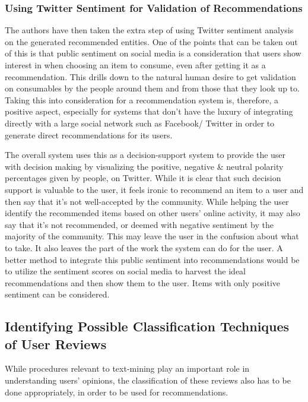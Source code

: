 \documentclass[manuscript,screen,review]{acmart}
\begin{document}
\subsubsection{Using Twitter Sentiment for Validation of Recommendations}
The authors have then taken the extra step of using Twitter sentiment analysis on the generated recommended entities. One of the points that can be taken out of this is that public sentiment on social media is a consideration that users show interest in when choosing an item to consume, even after getting it as a recommendation. This drills down to the natural human desire to get validation on consumables by the people around them and from those that they look up to. Taking this into consideration for a recommendation system is, therefore, a positive aspect, especially for systems that don't have the luxury of integrating directly with a large social network such as Facebook/ Twitter in order to generate direct recommendations for its users.

The overall system uses this as a decision-support system to provide the user with decision making by visualizing the positive, negative \& neutral polarity percentages given by people, on Twitter. While it is clear that such decision support is valuable to the user, it feels ironic to recommend an item to a user and then say that it's not well-accepted by the community. While helping the user identify the recommended items based on other users' online activity, it may also say that it's not recommended, or deemed with negative sentiment by the majority of the community. This may leave the user in the confusion about what to take. It also leaves the part of the work the system can do for the user. A better method to integrate this public sentiment into recommendations would be to utilize the sentiment scores on social media to harvest the ideal recommendations and then show them to the user. Items with only positive sentiment can be considered.


\subsection{Identifying Possible Classification Techniques of User Reviews}

While procedures relevant to text-mining play an important role in understanding users' opinions, the classification of these reviews also has to be done appropriately, in order to be used for recommendations.
\end{document}

